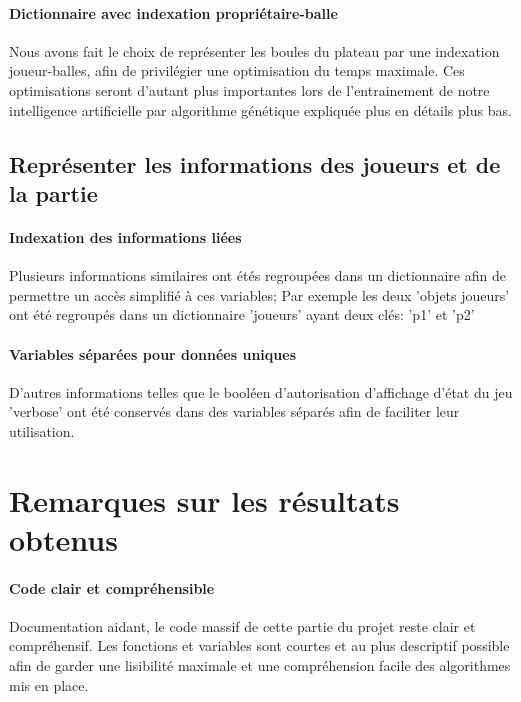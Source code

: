 \documentclass{scrreprt}
\begin{document}
				\paragraph{Dictionnaire avec indexation propriétaire-balle} 
				
				Nous avons fait le choix de représenter les boules du plateau par une indexation joueur-balles, afin de privilégier une optimisation du temps maximale. Ces optimisations seront d'autant plus importantes lors de l'entrainement de notre intelligence artificielle par algorithme génétique expliquée plus en détails plus bas.
			
			\subsection{Représenter les informations des joueurs et de la partie}
				\paragraph{Indexation des informations liées} 
				
				Plusieurs informations similaires ont étés regroupées dans un dictionnaire afin de permettre un accès simplifié à ces variables; Par exemple les deux 'objets joueurs' ont été regroupés dans un dictionnaire 'joueurs' ayant deux clés: 'p1' et 'p2'
				
				\paragraph{Variables séparées pour données uniques} 
				
				D'autres informations telles que le booléen d'autorisation d'affichage d'état du jeu 'verbose' ont été conservés dans des variables séparés afin de faciliter leur utilisation. 
				
			
		\section{Remarques sur les résultats obtenus}
			\paragraph{Code clair et compréhensible} 
			
			Documentation aidant, le code massif de cette partie du projet reste clair et compréhensif. Les fonctions et variables sont courtes et au plus descriptif possible afin de garder une lisibilité maximale et une compréhension facile des algorithmes mis en place.
			
\end{document}
